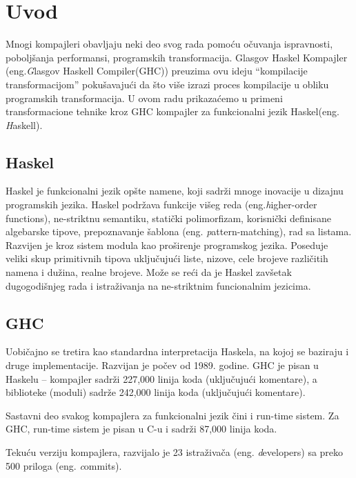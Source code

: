 \section{Uvod}
\label{sec:uvod}

Mnogi kompajleri obavljaju neki deo svog rada pomoću očuvanja ispravnosti, poboljšanja performansi, programskih transformacija. Glasgov Haskel Kompajler (eng.{\emph Glasgov Haskell Compiler(GHC)}) preuzima ovu ideju “kompilacije transformacijom” pokušavajući da što više izrazi proces kompilacije u obliku programskih transformacija. U ovom radu prikazaćemo u primeni transformacione tehnike kroz GHC kompajler za funkcionalni jezik Haskel(eng. {\emph Haskell}).

\subsection{Haskel}
\label{subsec:podnaslovHaskel}
Haskel je funkcionalni jezik opšte namene, koji sadrži mnoge inovacije u dizajnu programskih jezika. Haskel podržava funkcije višeg reda (eng.{\emph higher-order functions}), ne-striktnu semantiku, statički polimorfizam, korisnički definisane algebarske tipove, prepoznavanje šablona (eng. {\emph pattern-matching}), rad sa listama. Razvijen je kroz sistem modula kao proširenje programskog jezika. Poseduje veliki skup primitivnih tipova uključujući liste, nizove, cele brojeve različitih namena i dužina, realne brojeve. Može se reći da je Haskel zavšetak dugogodišnjeg rada i istraživanja na ne-striktnim funcionalnim jezicima. 

\subsection{GHC}
\label{subsec:podnaslovGHC}

Uobičajno se tretira kao standardna interpretacija Haskela, na kojoj se baziraju i druge implementacije. Razvijan je počev od 1989. godine. GHC je pisan u Haskelu – kompajler sadrži 227,000 linija koda (uključujući komentare), a biblioteke (moduli) sadrže 242,000 linija koda (uključujući komentare).

Sastavni deo svakog kompajlera za funkcionalni jezik čini i run-time sistem. Za GHC, run-time sistem je pisan u C-u i sadrži 87,000 linija koda.

Tekuću verziju kompajlera, razvijalo je 23 istraživača (eng. {\emph developers}) sa preko 500 priloga (eng. {\emph commits}).

